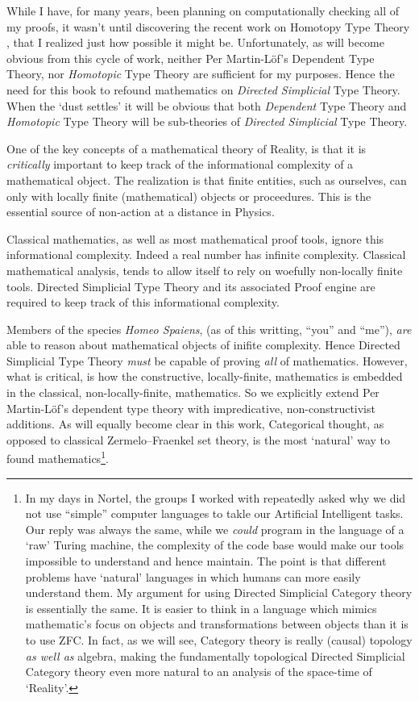 \documentclass[a4paper,openany]{amsbook}
\begin{document}
While I have, for many years, been planning on computationally checking all of
my proofs, it wasn't until discovering the recent work on Homotopy Type Theory
\cite{HoTT}, that I realized just how possible it might be. Unfortunately, as
will become obvious from this cycle of work, neither Per Martin-L\"of's
Dependent Type Theory, nor \emph{Homotopic} Type Theory are sufficient for my
purposes. Hence the need for this book to refound mathematics on \emph{Directed
Simplicial} Type Theory.  When the `dust settles' it will be obvious that both
\emph{Dependent} Type Theory and \emph{Homotopic} Type Theory will be
sub-theories of \emph{Directed Simplicial} Type Theory.

One of the key concepts of a mathematical theory of Reality, is that it is
\emph{critically} important to keep track of the informational complexity of a
mathematical object. The realization is that finite entities, such as ourselves,
can only  with locally finite (mathematical) objects or
proceedures. This is the essential source of non-action at a distance in
Physics.

Classical mathematics, as well as most mathematical proof tools, ignore this
informational complexity. Indeed a real number has infinite complexity. 
Classical mathematical analysis, tends to allow itself to rely on woefully
non-locally finite tools. Directed Simplicial Type Theory and its associated
Proof engine are required to keep track of this informational complexity.

Members of the species \textit{Homeo Spaiens}, (as of this writting, ``you'' and
``me''), \emph{are} able to reason about mathematical objects of inifite
complexity.  Hence Directed Simplicial Type Theory \emph{must} be capable of
proving \emph{all} of mathematics. However, what is critical, is how the
constructive, locally-finite, mathematics is embedded in the classical,
non-locally-finite, mathematics. So we explicitly extend Per Martin-L\"of's
dependent type theory with impredicative, non-constructivist additions. As will
equally become clear in this work, Categorical thought, as opposed to classical
Zermelo–Fraenkel set theory, is the most `natural' way to found
mathematics\footnote{In my days in Nortel, the groups I worked with repeatedly
asked why we did not use ``simple'' computer languages to takle our Artificial
Intelligent tasks. Our reply was always the same, while we \emph{could} program
in the language of a `raw' Turing machine, the complexity of the code base would
make our tools impossible to understand and hence maintain. The point is that
different problems have `natural' languages in which humans can more easily
understand them. My argument for using Directed Simplicial Category theory is
essentially the same. It is easier to think in a language which mimics
mathematic's focus on objects and transformations between objects than it is to
use ZFC. In fact, as we will see, Category theory is really (causal) topology
\emph{as well as} algebra, making the fundamentally topological Directed
Simplicial Category theory even more natural to an analysis of the space-time of
`Reality'.}.
\end{document}

